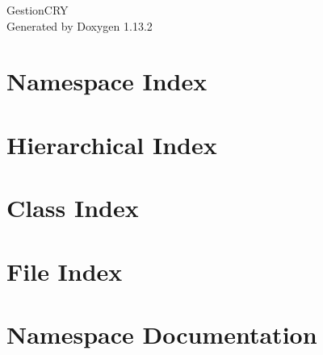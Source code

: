 \documentclass[twoside]{book}
\newcommand{\+}{\discretionary{\mbox{\scriptsize$\hookleftarrow$}}{}{}}
\newcommand{\clearemptydoublepage}{%
    \newpage{\pagestyle{empty}\cleardoublepage}%
  }
\begin{document}
  \raggedbottom
    \hypersetup{pageanchor=false,
                bookmarksnumbered=true,
                pdfencoding=unicode
               }
  \begin{titlepage}
  \vspace*{7cm}
  \begin{center}%
  {\Large Gestion\+CRY}\\
  \vspace*{1cm}
  {\large Generated by Doxygen 1.13.2}\\
  \end{center}
  \end{titlepage}
  \clearemptydoublepage
  \tableofcontents
  \clearemptydoublepage
  \hypersetup{pageanchor=true}
\chapter{Namespace Index}

\chapter{Hierarchical Index}

\chapter{Class Index}

\chapter{File Index}

\chapter{Namespace Documentation}






\end{document}
